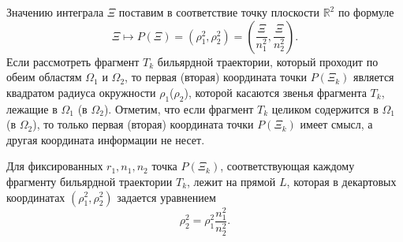 % 

%

\medskip
Значению интеграла $\Xi$ поставим в соответствие точку плоскости $\mathbb{R}^2$ по формуле 
\begin{equation}
\Xi \mapsto P(\Xi) = (\rho_1^2, \rho_2^2) = \left( \frac{\Xi}{n_1^2}, \frac{\Xi}{n_2^2} \right).
\label{eq:XiMap}
\end{equation}
Если рассмотреть фрагмент $T_k$ бильярдной траектории, который проходит по обеим областям $\Omega_1$ и $\Omega_2$, то первая (вторая) координата точки $P(\Xi_k)$ является квадратом радиуса окружности $\rho_1$($\rho_2$), которой касаются звенья фрагмента $T_k$, лежащие в $\Omega_1$ (в $\Omega_2$). 
Отметим, что если фрагмент $T_k$ целиком содержится в $\Omega_1$ (в $\Omega_2$), то только первая (вторая) координата точки $P(\Xi_k)$ имеет смысл, а другая координата информации не несет.
\medskip
\begin{remark}
Для фиксированных $r_1, n_1, n_2$ точка $P(\Xi_k)$, соответствующая каждому фрагменту бильярдной траектории $T_k$, лежит на прямой $L$, которая в декартовых координатах $(\rho_1^2, \rho_2^2)$ задается уравнением 
\begin{equation}
\rho_2^2 = \rho_1^2 \frac{n_1^2}{n_2^2}.
\label{eq:lineL}
\end{equation}

\end{remark}


